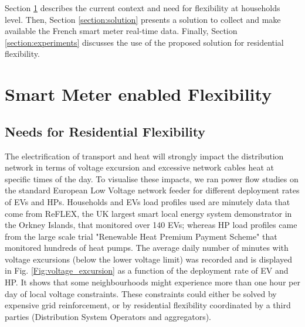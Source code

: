 \documentclass[conference]{IEEEtran}
\begin{document}
	
	Section \ref{section:needs} describes the current context and need for flexibility at households level. Then, Section \ref{section:solution} presents a solution to collect and make available the French smart meter real-time data.
	Finally, Section \ref{section:experiments} discusses the use of the proposed solution for residential flexibility.
	
	\section{Smart Meter enabled Flexibility}
	\label{section:needs}
	
	\subsection{Needs for Residential Flexibility}
	The electrification of transport and heat will strongly impact the distribution network
	in terms of voltage excursion and excessive network cables heat at specific times of the day. To visualise these impacts, we ran power flow studies on the standard European Low Voltage network feeder \cite{IEEE:PESTestFeeder} for different deployment rates of EVs and HPs.
	 Households and EVs load profiles used are minutely data that come from ReFLEX, the UK  largest smart local energy system demonstrator in the Orkney Islands, 
	 that monitored over 140 EVs; whereas HP load profiles came from the large scale trial "Renewable Heat Premium Payment Scheme" \cite{RHPP} that monitored hundreds of heat pumps.
The average daily number of minutes with voltage excursions (below the lower voltage limit) was recorded and is displayed in Fig. \ref{Fig:voltage_excursion} as a function of the deployment rate of EV and HP. It shows that some neighbourhoods
might experience more than one hour per day of local voltage constraints. These constraints could either be solved by expensive grid reinforcement, or by residential flexibility coordinated by a third parties (Distribution System Operators and aggregators). 
	
\end{document}
